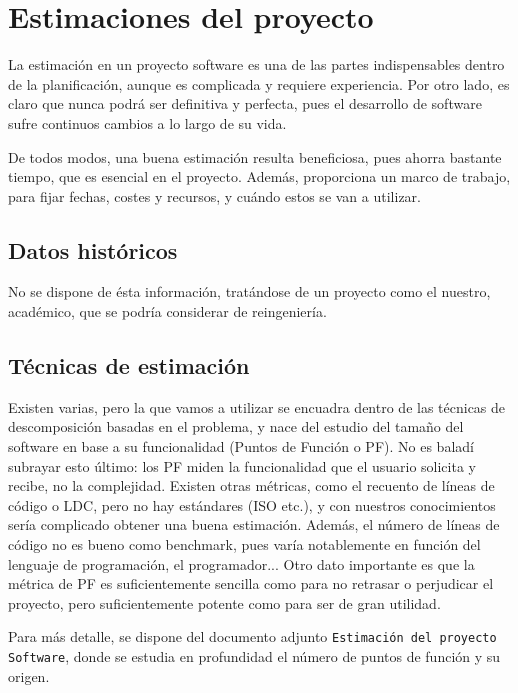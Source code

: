 \documentclass[spanish,a4paper,12pt]{report}	%
\begin{document}
\newpage
\mbox{}
\thispagestyle{empty}						%
\newpage
\setcounter{section}{0}

\chapter{Estimaciones del proyecto}

		La estimación en un proyecto software es una de las partes indispensables dentro
		de la planificación, aunque es complicada y requiere experiencia. Por otro lado,
		es claro que nunca podrá ser definitiva y perfecta, pues el desarrollo de
		software sufre continuos cambios a lo largo de su vida.
		
		De todos modos, una buena estimación resulta beneficiosa, pues ahorra bastante
		tiempo, que es esencial en el proyecto. Además, proporciona un marco de trabajo,
		para fijar fechas, costes y recursos, y cuándo estos se van a utilizar.

	\section{Datos históricos}
		No se dispone de ésta información, tratándose de un proyecto como el nuestro,
		académico, que se podría considerar de reingeniería.

	\section{Técnicas de estimación}
		Existen varias, pero la que vamos a utilizar se encuadra dentro de las técnicas
		de descomposición basadas en el problema, y nace del estudio del tamaño del
		software en base a su funcionalidad (Puntos de Función o PF). No es baladí
		subrayar esto último: los PF miden la funcionalidad que el usuario solicita y
		recibe, no la complejidad. Existen otras métricas, como el recuento de líneas de
		código o LDC, pero no hay estándares (ISO etc.), y con nuestros conocimientos
		sería complicado obtener una buena estimación. Además, el número de líneas de
		código no es bueno como benchmark, pues varía notablemente en función del
		lenguaje de programación, el programador... Otro dato importante es que la
		métrica de PF es suficientemente sencilla como para no retrasar o perjudicar el
		proyecto, pero suficientemente potente como para ser de gran utilidad.


		Para más detalle, se dispone del documento adjunto \texttt{Estimación del
		proyecto Software}, donde se estudia en profundidad el número de puntos de
		función y su origen.
\end{document}
